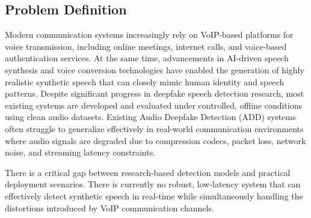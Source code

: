\subsection{Problem Definition}

Modern communication systems increasingly rely on VoIP-based platforms for voice transmission, including online meetings, internet calls, and voice-based authentication services. At the same time, advancements in AI-driven speech synthesis and voice conversion technologies have enabled the generation of highly realistic synthetic speech that can closely mimic human identity and speech patterns. Despite significant progress in deepfake speech detection research, most existing systems are developed and evaluated under controlled, offline conditions using clean audio datasets. Existing Audio Deepfake Detection (ADD) systems often struggle to generalize effectively in real-world communication environments where audio signals are degraded due to compression codecs, packet loss, network noise, and streaming latency constraints.

There is a critical gap between research-based detection models and practical deployment scenarios. There is currently no robust, low-latency system that can effectively detect synthetic speech in real-time while simultaneously handling the distortions introduced by VoIP communication channels.